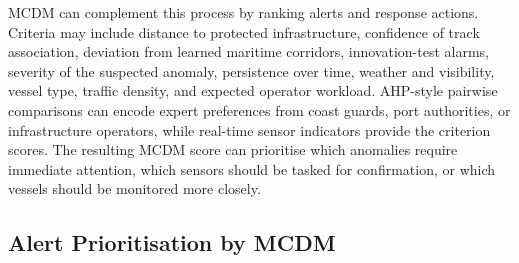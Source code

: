 MCDM can complement this process by ranking alerts and response actions. Criteria may include distance to protected infrastructure, confidence of track association, deviation from learned maritime corridors, innovation-test alarms, severity of the suspected anomaly, persistence over time, weather and visibility, vessel type, traffic density, and expected operator workload. AHP-style pairwise comparisons can encode expert preferences from coast guards, port authorities, or infrastructure operators, while real-time sensor indicators provide the criterion scores. The resulting MCDM score can prioritise which anomalies require immediate attention, which sensors should be tasked for confirmation, or which vessels should be monitored more closely.
\subsection{Alert Prioritisation by MCDM}
\label{subsec:maritime-mcdm}
